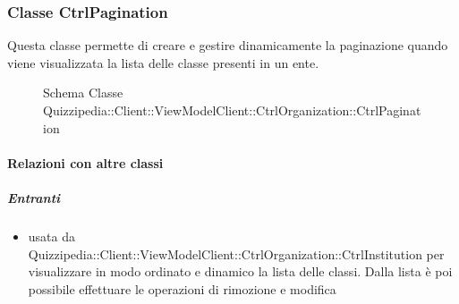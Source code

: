 \subsubsection{Classe CtrlPagination}
Questa classe permette di creare e gestire dinamicamente la paginazione quando viene visualizzata la lista delle classe presenti in un ente.
\begin{figure}[H]
\centering
\noindent{}
\caption[Schema Classe CtrlPagination]{Schema Classe Quizzipedia::Client::ViewModelClient::CtrlOrganization::CtrlPagination}
\end{figure}
\paragraph{Relazioni con altre classi}
\subparagraph{Entranti}
\begin{itemize}
\item usata da Quizzipedia::Client::ViewModelClient::CtrlOrganization::CtrlInstitution per visualizzare in modo ordinato e dinamico la lista delle classi. Dalla lista è poi possibile effettuare le operazioni di rimozione e modifica
\end{itemize}
